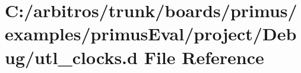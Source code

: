 \hypertarget{boards_2primus_2examples_2primus_eval_2project_2_debug_2utl__clocks_8d}{\section{C\-:/arbitros/trunk/boards/primus/examples/primus\-Eval/project/\-Debug/utl\-\_\-clocks.d File Reference}
\label{boards_2primus_2examples_2primus_eval_2project_2_debug_2utl__clocks_8d}
}
